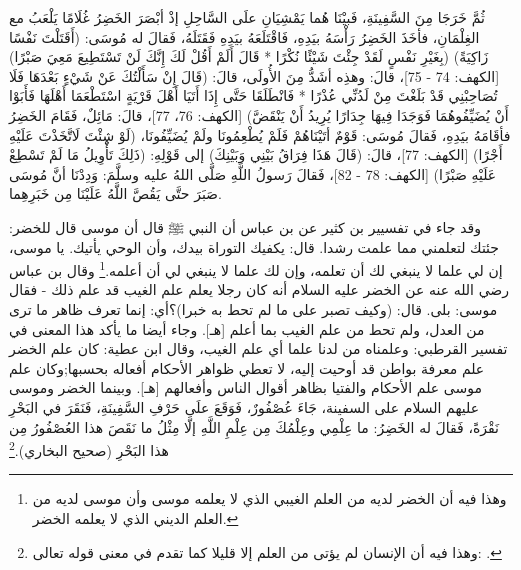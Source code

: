 {ثُمَّ خَرَجَا مِنَ السَّفِينَةِ، فَبيْنَا هُما يَمْشِيَانِ علَى السَّاحِلِ إذْ أبْصَرَ الخَضِرُ غُلَامًا يَلْعَبُ مع الغِلْمَانِ، فأخَذَ الخَضِرُ رَأْسَهُ بيَدِهِ، فَاقْتَلَعَهُ بيَدِهِ فَقَتَلَهُ، فَقالَ له مُوسَى: (أَقَتَلْتَ نَفْسًا زَاكِيَةً) (بِغَيْرِ نَفْسٍ لَقَدْ جِئْتَ شَيْئًا نُكْرًا * قَالَ أَلَمْ أَقُلْ لَكَ إِنَّكَ لَنْ تَسْتَطِيعَ مَعِيَ صَبْرًا) [الكهف: 74 - 75]، قالَ: وهذِه أشَدُّ مِنَ الأُولَى، قالَ: (قَالَ إِنْ سَأَلْتُكَ عَنْ شَيْءٍ بَعْدَهَا فَلَا تُصَاحِبْنِي قَدْ بَلَغْتَ مِنْ لَدُنِّي عُذْرًا * فَانْطَلَقَا حَتَّى إِذَا أَتَيَا أَهْلَ قَرْيَةٍ اسْتَطْعَمَا أَهْلَهَا فَأَبَوْا أَنْ يُضَيِّفُوهُمَا فَوَجَدَا فِيهَا جِدَارًا يُرِيدُ أَنْ يَنْقَضَّ) [الكهف: 76، 77]، قالَ: مَائِلٌ، فَقَامَ الخَضِرُ فأقَامَهُ بيَدِهِ، فَقالَ مُوسَى: قَوْمٌ أتَيْنَاهُمْ فَلَمْ يُطْعِمُونَا ولَمْ يُضَيِّفُونَا، (لَوْ شِئْتَ لَاتَّخَذْتَ عَلَيْهِ أَجْرًا) [الكهف: 77]، قالَ: (قَالَ هَذَا فِرَاقُ بَيْنِي وَبَيْنِكَ) إلى قَوْلِهِ: (ذَلِكَ تَأْوِيلُ مَا لَمْ تَسْطِعْ عَلَيْهِ صَبْرًا) [الكهف: 78 - 82]، فَقالَ رَسولُ اللَّهِ صَلَّى اللهُ عليه وسلَّمَ: وَدِدْنَا أنَّ مُوسَى صَبَرَ حتَّى يَقُصَّ اللَّهُ عَلَيْنَا مِن خَبَرِهِما. 
}

وقد جاء في تفسيير بن كثير عن بن عباس أن النبي ﷺ قال أن موسى قال للخضر: جئتك لتعلمني مما علمت رشدا. قال: يكفيك التوراة بيدك، وأن الوحي يأتيك. يا موسى، إن لي علما لا ينبغي لك أن تعلمه، وإن لك علما لا ينبغي لي أن أعلمه.\footnote{وهذا فيه أن الخضر لديه من العلم الغيبي الذي لا يعلمه موسى وأن موسى لديه من العلم الديني الذي لا يعلمه الخضر.} وقال بن عباس رضي الله عنه عن الخضر عليه السلام أنه كان رجلا يعلم علم الغيب قد علم ذلك - فقال موسى: بلى. قال: (وكيف تصبر على ما لم تحط به خبرا)؟أي: إنما تعرف ظاهر ما ترى من العدل، ولم تحط من علم الغيب بما أعلم [هـ]. وجاء أيضا ما يأكد هذا المعنى في تفسير القرطبي: وعلمناه من لدنا علما أي علم الغيب، وقال ابن عطية: كان علم الخضر علم معرفة بواطن قد أوحيت إليه، لا تعطي ظواهر الأحكام أفعاله بحسبها;وكان علم موسى علم الأحكام والفتيا بظاهر أقوال الناس وأفعالهم [هـ].
وبينما الخضر وموسى عليهم السلام على السفينة، جَاءَ عُصْفُورٌ، فَوَقَعَ علَى حَرْفِ السَّفِينَةِ، فَنَقَرَ في البَحْرِ نَقْرَةً، فَقالَ له الخَضِرُ: ما عِلْمِي وعِلْمُكَ مِن عِلْمِ اللَّهِ إلَّا مِثْلُ ما نَقَصَ هذا العُصْفُورُ مِن هذا البَحْرِ {\footnotesize (صحيح البخاري)}.\footnote{وهذا فيه أن الإنسان لم يؤتى من العلم إلا قليلا كما تقدم في معنى قوله تعالى:
\quranayah*[17][85]{\footnotesize \surahname*[17]}.} 

